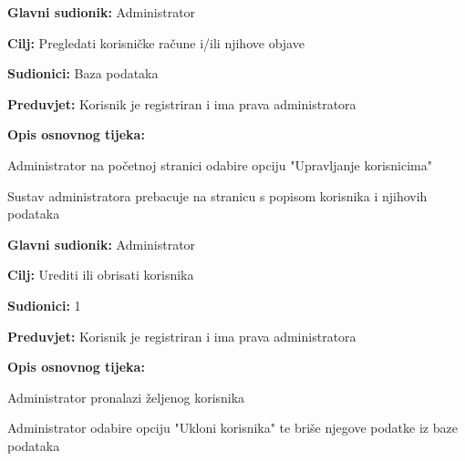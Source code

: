 \noindent {}
\begin{packed_item}
	\item \textbf{Glavni sudionik:} Administrator
	\item  \textbf{Cilj:} Pregledati korisničke račune i/ili njihove objave
	\item  \textbf{Sudionici:} Baza podataka
	\item  \textbf{Preduvjet:} Korisnik je registriran i ima prava administratora
	\item  \textbf{Opis osnovnog tijeka:}
	
	\item[] \begin{packed_enum}
		
		\item Administrator na početnoj stranici odabire opciju "Upravljanje korisnicima"
		\item Sustav administratora prebacuje na stranicu s popisom korisnika i njihovih podataka

	\end{packed_enum}

\end{packed_item}


\noindent {}
\begin{packed_item}
	\item \textbf{Glavni sudionik:} Administrator
	\item  \textbf{Cilj:} Urediti ili obrisati korisnika
	\item  \textbf{Sudionici:} 1
	\item  \textbf{Preduvjet:} Korisnik je registriran i ima prava administratora
	\item  \textbf{Opis osnovnog tijeka:}
	
	\item[] \begin{packed_enum}
		
		\item Administrator pronalazi željenog korisnika
		\item Administrator odabire opciju "Ukloni korisnika" te briše njegove podatke iz baze podataka
	\end{packed_enum}

\end{packed_item}


